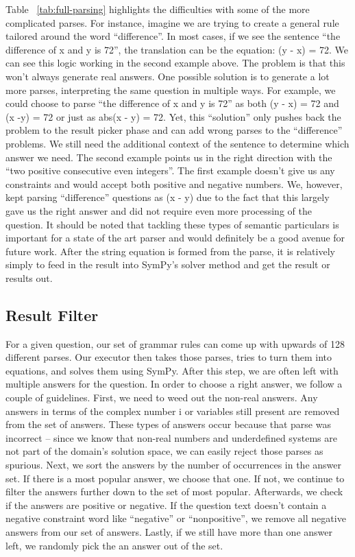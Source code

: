 \documentclass[11pt]{article}
\begin{document}
Table ~\ref{tab:full-parsing} highlights the difficulties with some of the more complicated parses. For instance, imagine we are trying to create a general rule tailored around the word ``difference''. In most cases, if we see the sentence ``the difference of x and y is 72'', the translation can be the equation: (y - x) = 72. We can see this logic working in the second example above. The problem is that this won't always generate real answers. One possible solution is to generate a lot more parses, interpreting the same question in multiple ways. For example, we could choose to parse ``the difference of x and y is 72'' as both (y - x) = 72 and (x -y) = 72 or just as abs(x - y) = 72. Yet, this ``solution'' only pushes back the problem to the result picker phase and can add wrong parses to the ``difference'' problems. We still need the additional context of the sentence to determine which answer we need. The second example points us in the right direction with the ``two positive consecutive even integers''. The first example doesn't give us any constraints and would accept both positive and negative numbers. We, however, kept parsing ``difference'' questions as (x - y) due to the fact that this largely gave us the right answer and  did not require even more processing of the question. It should be noted that tackling these types of semantic particulars is important for a state of the art parser and would definitely be a good avenue for future work. After the string equation is formed from the parse, it is relatively simply to feed in the result into SymPy's solver method and get the result or results out.

\subsection{Result Filter}
For a given question, our set of grammar rules can come up with upwards of 128 different parses. Our executor then takes those parses, tries to turn them into equations, and solves them using SymPy. After this step, we are often left with multiple answers for the question. In order to choose a right answer, we follow a couple of guidelines. First, we need to weed out the non-real answers. Any answers in terms of the complex number i or variables still present are removed from the set of answers. These types of answers occur because that parse was incorrect -- since we know that non-real numbers and underdefined systems are not part of the domain's solution space, we can easily reject those parses as spurious. Next, we sort the answers by the number of occurrences in the answer set. If there is a most popular answer, we choose that one. If not, we continue to filter the answers further down to the set of most popular. Afterwards, we check if the answers are positive or negative. If the question text doesn't contain a negative constraint word like ``negative'' or ``nonpositive'', we remove all negative answers from our set of answers. Lastly, if we still have more than one answer left, we randomly pick the an answer out of the set.
\end{document}
